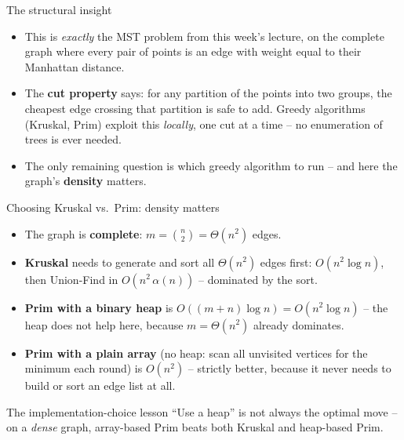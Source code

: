 \documentclass[11pt,aspectratio=169]{beamer}
\begin{document}
\begin{frame}{The structural insight}
  \begin{itemize}
    \item This is \emph{exactly} the MST problem from this week's lecture, on
    the complete graph where every pair of points is an edge with weight equal
    to their Manhattan distance.
    \item The \textbf{cut property} says: for any partition of the points into
    two groups, the cheapest edge crossing that partition is safe to add. Greedy
    algorithms (Kruskal, Prim) exploit this \emph{locally}, one cut at a time --
    no enumeration of trees is ever needed.
    \item The only remaining question is which greedy algorithm to run --
    and here the graph's \textbf{density} matters.
  \end{itemize}
\end{frame}

\begin{frame}{Choosing Kruskal vs.\ Prim: density matters}
  \begin{itemize}
    \item The graph is \textbf{complete}: $m = \binom{n}{2} = \Theta(n^2)$ edges.
    \item \textbf{Kruskal} needs to generate and sort all $\Theta(n^2)$ edges
    first: $O(n^2\log n)$, then Union-Find in $O(n^2\,\alpha(n))$ -- dominated by
    the sort.
    \item \textbf{Prim with a binary heap} is $O((m+n)\log n) = O(n^2\log n)$ --
    the heap does not help here, because $m=\Theta(n^2)$ already dominates.
    \item \textbf{Prim with a plain array} (no heap: scan all unvisited vertices
    for the minimum each round) is $O(n^2)$ -- strictly better, because it never
    needs to build or sort an edge list at all.
  \end{itemize}
  \begin{alertblock}{The implementation-choice lesson}
    ``Use a heap'' is not always the optimal move -- on a \emph{dense} graph,
    array-based Prim beats both Kruskal and heap-based Prim.
  \end{alertblock}
\end{frame}
\end{document}

